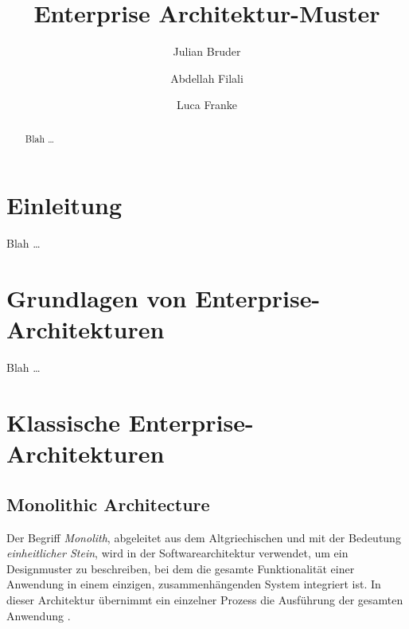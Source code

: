 \documentclass[acmtog]{acmart}
\begin{document}
\title{Enterprise Architektur-Muster}

\author{Julian Bruder}
\author{Abdellah Filali}
\authornotemark[1]
\author{Luca Franke}
\authornotemark[1]
\renewcommand{\shortauthors}{Bruder, Filali, Franke}

\begin{abstract}
Blah \ldots
\end{abstract}

\maketitle

\section{Einleitung}
Blah \ldots

\section{Grundlagen von Enterprise-Architekturen}
Blah \ldots

\section{Klassische Enterprise-Architekturen}
\subsection{Monolithic Architecture}
Der Begriff \textit{Monolith}, abgeleitet aus dem Altgriechischen und mit der Bedeutung
\textit{einheitlicher Stein}, wird in der Softwarearchitektur verwendet, um ein Designmuster
zu beschreiben, bei dem die gesamte Funktionalität einer Anwendung in einem einzigen,
zusammenhängenden System integriert ist.
In dieser Architektur übernimmt ein einzelner Prozess die Ausführung der gesamten Anwendung \cite[1]{mono}.
\end{document}
